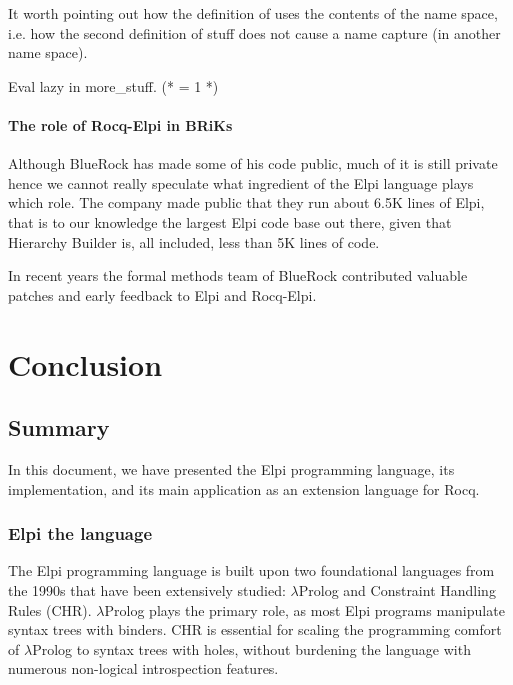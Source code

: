 \documentclass[a4paper, 11pt]{book}
\begin{document}
It worth pointing out how the definition of 
uses the contents of the name space, i.e. how the second definition
of stuff does not cause a name capture (in another name space).

\begin{rocqcode}
Eval lazy in more_stuff. (* = 1 *)
\end{rocqcode}

\subsubsection{The role of Rocq-Elpi in BRiKs}

Although BlueRock has made some of his code public, much of it is still
private hence we cannot really speculate what ingredient of the Elpi
language plays which role.
The company made public that they run about 6.5K lines of Elpi, that is
to our knowledge the largest Elpi code base out there, given that Hierarchy
Builder is, all included, less than 5K lines of code.

In recent years the formal methods team of BlueRock contributed valuable
patches and early feedback to Elpi and Rocq-Elpi.  

\chapter{Conclusion}

\section{Summary}


In this document, we have presented the Elpi programming language, its
implementation, and its main application as an extension language for Rocq.

\subsection{Elpi the language}

The Elpi programming language is built upon two foundational languages from the
1990s that have been extensively studied: $\lambda$Prolog and Constraint
Handling Rules (CHR). $\lambda$Prolog plays the primary role, as most Elpi
programs manipulate syntax trees with binders. CHR is essential for scaling the
programming comfort of $\lambda$Prolog to syntax trees with holes, without
burdening the language with numerous non-logical introspection features.
\end{document}
